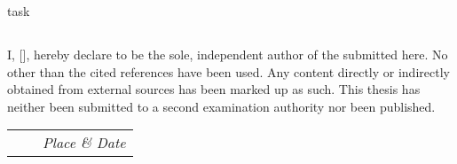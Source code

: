 \cleardoubleoddpage%
{task}%
\cleardoubleoddpage
\vspace*{\fill}
%
%
\subsection*{\TransAuthorshipDeclTitle}
{%
\makeatletter
I, \@author{} [\@immnumber], hereby declare to be the sole, independent author of the \@thesis{} submitted here.
No other than the cited references have been used.
Any content directly or indirectly obtained from external sources has been marked up as such.
This thesis has neither been submitted to a second examination authority nor been published.\\[\baselineskip]

\begin{center}
	\begin{tabular}{M{12em}M{4em}M{12em}}
		{\itshape\@author} & & \textit{Place \& Date}\\
	\end{tabular}
\end{center}
\makeatother%
}%
\cleardoublepage
